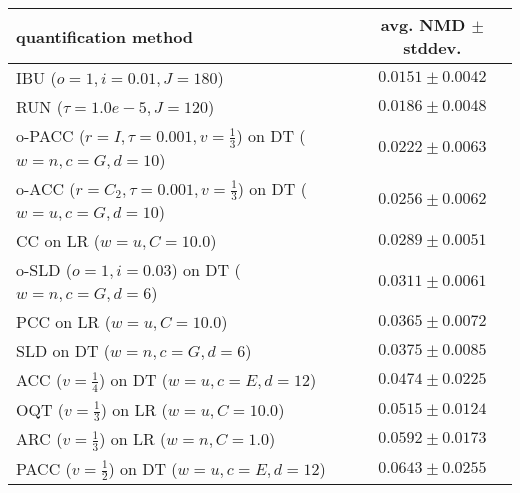 \begin{tabular}{lc}
  \toprule
  quantification method & avg. NMD $\pm$ stddev. \\
  \midrule
  IBU ($o=1, i=0.01, J=180$) & $\mathbf{0.0151 \pm 0.0042}$ \\
  RUN ($\tau=1.0e-5, J=120$) & $0.0186 \pm 0.0048$ \\
  o-PACC ($r=I, \tau=0.001, v=\frac{1}{3}$) on DT ($w=n, c=G, d=10$) & $0.0222 \pm 0.0063$ \\
  o-ACC ($r=C_2, \tau=0.001, v=\frac{1}{3}$) on DT ($w=u, c=G, d=10$) & $0.0256 \pm 0.0062$ \\
  CC on LR ($w=u, C=10.0$) & $0.0289 \pm 0.0051$ \\
  o-SLD ($o=1, i=0.03$) on DT ($w=n, c=G, d=6$) & $0.0311 \pm 0.0061$ \\
  PCC on LR ($w=u, C=10.0$) & $0.0365 \pm 0.0072$ \\
  SLD on DT ($w=n, c=G, d=6$) & $0.0375 \pm 0.0085$ \\
  ACC ($v=\frac{1}{4}$) on DT ($w=u, c=E, d=12$) & $0.0474 \pm 0.0225$ \\
  OQT ($v=\frac{1}{3}$) on LR ($w=u, C=10.0$) & $0.0515 \pm 0.0124$ \\
  ARC ($v=\frac{1}{3}$) on LR ($w=n, C=1.0$) & $0.0592 \pm 0.0173$ \\
  PACC ($v=\frac{1}{2}$) on DT ($w=u, c=E, d=12$) & $0.0643 \pm 0.0255$ \\
  \bottomrule
\end{tabular}
